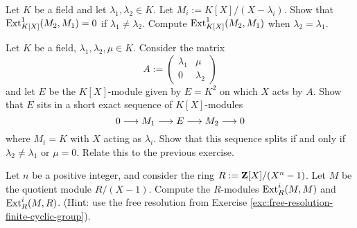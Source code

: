 \begin{exercise}
Let $K$ be a field and let $\lambda_1,\lambda_2\in K$. Let $M_i:= K[X]/(X-\lambda_i)$. 
Show that $\operatorname{Ext}^1_{K[X]}(M_2,M_1) =0$ if $\lambda_1\neq \lambda_2$. Compute 
$\operatorname{Ext}^1_{K[X]}(M_2,M_1)$ when $\lambda_2=\lambda_1$.
\end{exercise}

\begin{exercise}
Let $K$ be a field, $\lambda_1,\lambda_2,\mu \in K$. Consider the matrix
\[
	A := \begin{pmatrix} \lambda_1 & \mu \\ 0 & \lambda_2 \end{pmatrix}
\]
and let $E$ be the $K[X]$-module given by $E=K^2$ on which $X$ acts by $A$. Show that
$E$ sits in a short exact sequence of $K[X]$-modules
\[
	0 \longrightarrow M_1 \longrightarrow E \longrightarrow M_2 \longrightarrow 0
\]
where $M_i=K$ with $X$ acting as $\lambda_i$. Show that this sequence splits if and only if
 $\lambda_2\neq \lambda_1$ or $\mu=0$. Relate this to the previous exercise.
\end{exercise}


\begin{exercise}
Let $n$ be a positive integer, and consider the ring $R := {\mathbf{Z}}[X]/(X^n-1)$. Let $M$ be the quotient module $R/(X-1)$. Compute the $R$-modules $\operatorname{Ext}^i_R(M,M)$ and $\operatorname{Ext}^i_R(M,R)$. (Hint: use the free resolution from Exercise \ref{exc:free-resolution-finite-cyclic-group}).
\end{exercise}


